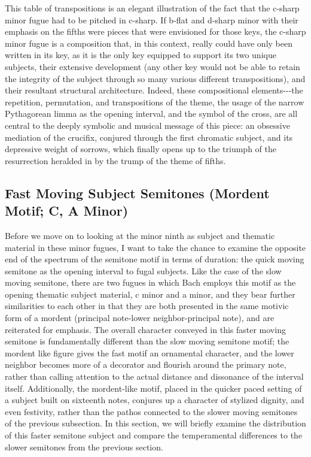 This table of transpositions is an elegant illustration of the fact that
the c-sharp minor fugue had to be pitched in c-sharp. If b-flat and
d-sharp minor with their emphasis on the fifths were pieces that were
envisioned for those keys, the c-sharp minor fugue is a composition
that, in this context, really could have only been written in its key,
as it is the only key equipped to support its two unique subjects, their
extensive development (any other key would not be able to retain the
integrity of the subject through so many various different
transpositions), and their resultant structural architecture. Indeed,
these compositional elements-\/-\/-the repetition, permutation, and
transpositions of the theme, the usage of the narrow Pythagorean limma
as the opening interval, and the symbol of the cross, are all central to
the deeply symbolic and musical message of this piece: an obsessive
mediation of the crucifix, conjured through the first chromatic subject,
and its depressive weight of sorrows, which finally opens up to the
triumph of the resurrection heralded in by the trump of the theme of
fifths.

    \subsection{Fast Moving Subject Semitones (Mordent Motif; C, A
Minor)}\label{fast-moving-subject-semitones-mordent-motif-c-a-minor}

Before we move on to looking at the minor ninth as subject and thematic
material in these minor fugues, I want to take the chance to examine the
opposite end of the spectrum of the semitone motif in terms of duration:
the quick moving semitone as the opening interval to fugal subjects.
Like the case of the slow moving semitone, there are two fugues in which
Bach employs this motif as the opening thematic subject material, c
minor and a minor, and they bear further similarities to each other in
that they are both presented in the same motivic form of a mordent
(principal note-lower neighbor-principal note), and are reiterated for
emphasis. The overall character conveyed in this faster moving semitone
is fundamentally different than the slow moving semitone motif; the
mordent like figure gives the fast motif an ornamental character, and
the lower neighbor becomes more of a decorator and flourish around the
primary note, rather than calling attention to the actual distance and
dissonance of the interval itself. Additionally, the mordent-like motif,
placed in the quicker paced setting of a subject built on sixteenth
notes, conjures up a character of stylized dignity, and even festivity,
rather than the pathos connected to the slower moving semitones of the
previous subsection. In this section, we will briefly examine the
distribution of this faster semitone subject and compare the
temperamental differences to the slower semitones from the previous
section.

